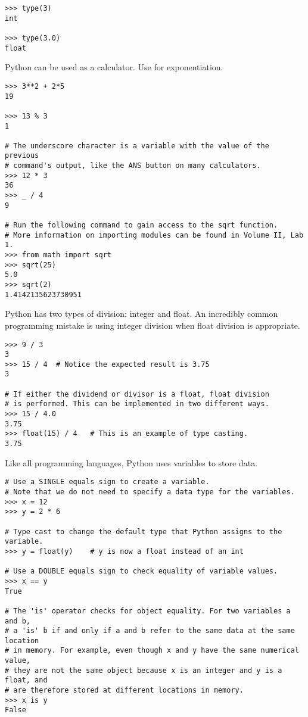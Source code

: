 \begin{lstlisting}
>>> type(3)
int

>>> type(3.0)
float
\end{lstlisting}

Python can be used as a calculator. Use \li{**} for exponentiation.
\begin{lstlisting}
>>> 3**2 + 2*5
19

>>> 13 % 3
1

# The underscore character is a variable with the value of the previous
# command's output, like the ANS button on many calculators.
>>> 12 * 3
36
>>> _ / 4
9

# Run the following command to gain access to the sqrt function.
# More information on importing modules can be found in Volume II, Lab 1.
>>> from math import sqrt
>>> sqrt(25)
5.0
>>> sqrt(2)
1.4142135623730951
\end{lstlisting}

Python has two types of division: integer and float.
An incredibly common programming mistake is using integer division when float division is appropriate. %
\begin{lstlisting}
>>> 9 / 3
3
>>> 15 / 4	# Notice the expected result is 3.75
3

# If either the dividend or divisor is a float, float division
# is performed. This can be implemented in two different ways.
>>> 15 / 4.0
3.75
>>> float(15) / 4	# This is an example of type casting.
3.75
\end{lstlisting}

Like all programming languages, Python uses variables to store data.

\begin{lstlisting}
# Use a SINGLE equals sign to create a variable.
# Note that we do not need to specify a data type for the variables.
>>> x = 12
>>> y = 2 * 6

# Type cast to change the default type that Python assigns to the variable.
>>> y = float(y)	# y is now a float instead of an int

# Use a DOUBLE equals sign to check equality of variable values.
>>> x == y  
True

# The 'is' operator checks for object equality. For two variables a and b,
# a 'is' b if and only if a and b refer to the same data at the same location
# in memory. For example, even though x and y have the same numerical value,
# they are not the same object because x is an integer and y is a float, and
# are therefore stored at different locations in memory.
>>> x is y
False                   
\end{lstlisting}

